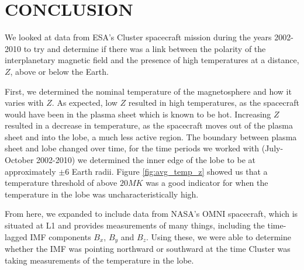 \documentclass[12pt]{article}
\begin{document}
\section{CONCLUSION}
We looked at data from ESA's Cluster spacecraft mission during the years 2002-2010 to try and determine if there was a link between the polarity of the interplanetary magnetic field and the presence of high temperatures at a distance, $Z$, above or below the Earth.

First, we determined the nominal temperature of the magnetosphere and how it varies with $Z$. As expected, low $Z$ resulted in high temperatures, as the spacecraft would have been in the plasma sheet which is known to be hot. Increasing $Z$ resulted in a decrease in temperature, as the spacecraft moves out of the plasma sheet and into the lobe, a much less active region. The boundary between plasma sheet and lobe changed over time, for the time periods we worked with (July-October 2002-2010) we determined the inner edge of the lobe to be at approximately $\pm6$ Earth radii. Figure \ref{fig:avg_temp_z} showed us that a temperature threshold of above $20MK$ was a good indicator for when the temperature in the lobe was uncharacteristically high.

From here, we expanded to include data from NASA's OMNI spacecraft, which is situated at L1 and provides measurements of many things, including the time-lagged IMF components $B_x$, $B_y$ and $B_z$. Using these, we were able to determine whether the IMF was pointing northward or southward at the time Cluster was taking measurements of the temperature in the lobe. 

\printbibliography
\end{document}
